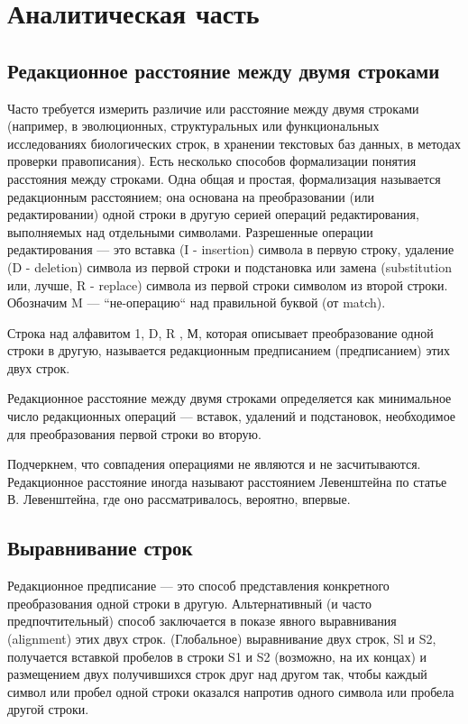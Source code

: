 \section{Аналитическая часть}
\subsection{Редакционное расстояние между двумя строками}

\hspace{1.25cm}
Часто требуется измерить различие или расстояние между двумя строками (например, в эволюционных, структуральных или функциональных исследованиях биологических строк, в хранении текстовых баз данных, в методах проверки правописания). Есть несколько способов формализации понятия расстояния между строками. Одна общая и простая, формализация называется редакционным расстоянием; она основана на преобразовании (или редактировании) одной строки в другую серией операций редактирования, выполняемых над отдельными символами. Разрешенные операции редактирования — это вставка (I - insertion) символа в первую строку, удаление (D - deletion) символа из первой строки и подстановка или замена (substitution или, лучше, R - replace) символа из первой строки символом из второй строки. Обозначим M — “не-операцию“ над правильной буквой (от match).

Строка над алфавитом 1, D, R , М, которая описывает преобразование одной строки в другую, называется редакционным предписанием (предписанием) этих двух строк.

Редакционное расстояние между двумя строками определяется как минимальное число редакционных операций — вставок, удалений и подстановок, необходимое для преобразования первой строки во вторую.

Подчеркнем, что совпадения операциями не являются и не засчитываются.
Редакционное расстояние иногда называют расстоянием Левенштейна по статье В. Левенштейна, где оно рассматривалось, вероятно, впервые.\cite{levenshtein}

\subsection{Выравнивание строк}

\hspace{1.25cm}
Редакционное предписание — это способ представления конкретного преобразования одной строки в другую. Альтернативный (и часто предпочтительный) способ заключается в показе явного выравнивания (alignment) этих двух строк.
(Глобальное) выравнивание двух строк, Sl и S2, получается вставкой пробелов в строки S1 и S2 (возможно, на их концах) и размещением двух получившихся строк друг над другом так, чтобы каждый символ или пробел одной строки оказался напротив одного символа или пробела другой строки.


